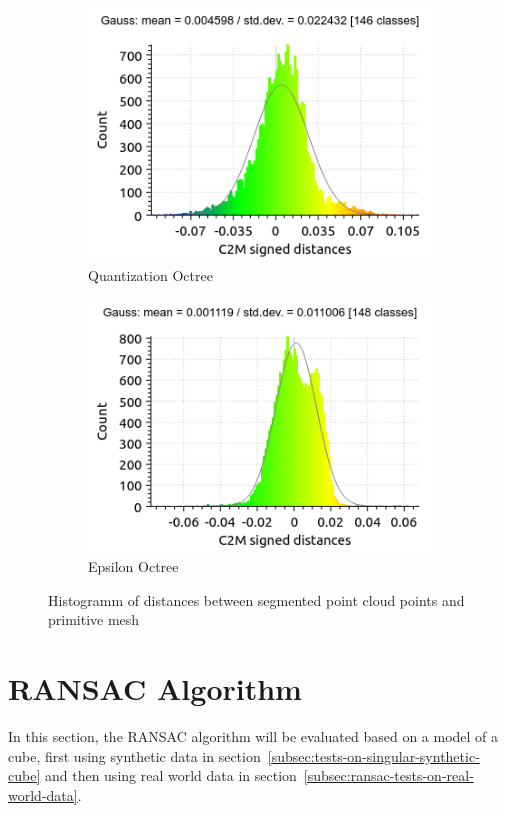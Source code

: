 \begin{figure}[h!tbp]
    \centering
    \begin{subfigure}[b]{0.5\textwidth}
        \centering
        \includegraphics[width=0.9\linewidth]{images/eval-quant-hist}
        \caption{Quantization Octree}
    \end{subfigure}%
    \begin{subfigure}[b]{0.5\textwidth}
        \centering
        \includegraphics[width=0.9\linewidth]{images/eval-epsilon-hist}
        \caption{Epsilon Octree}
    \end{subfigure}%
    \caption{Histogramm of distances between segmented point cloud points and primitive mesh}
    \label{fig:octrees-compairison-stats}
\end{figure}

\section{RANSAC Algorithm}\label{sec:eval-ransac-algorithm}
In this section, the RANSAC algorithm will be evaluated based on a model of a cube,
first using synthetic data in section~\ref{subsec:tests-on-singular-synthetic-cube} and then using real world data
in section~\ref{subsec:ransac-tests-on-real-world-data}.


